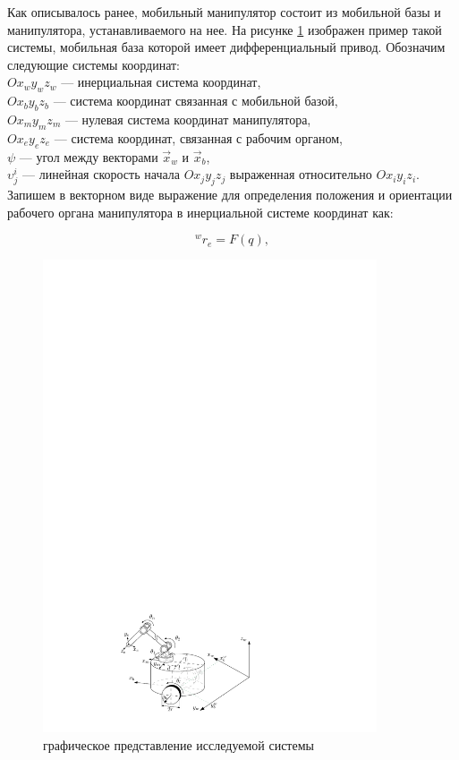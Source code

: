 \documentclass[14pt, a4paper]{extreport}
\begin{document}
Как описывалось ранее, мобильный манипулятор состоит из мобильной базы и манипулятора, устанавливаемого на нее. На рисунке \ref{pic:5} изображен пример такой системы, мобильная база которой имеет дифференциальный привод. Обозначим следующие системы координат:\\[2mm]
$O x_w y_w z_w$ --- инерциальная система координат,\\[2mm]
$O x_b y_b z_b$ --- система координат связанная с мобильной базой,\\[2mm]
$O x_m y_m z_m$ --- нулевая система координат манипулятора,\\[2mm]
$O x_e y_e z_e$ --- система координат, связанная с рабочим органом,\\[2mm]
$\psi$ --- угол между векторами $\vec{x}_w$ и $\vec{x}_b$,\\[2mm]
$\upsilon_{j}^{i}$ --- линейная скорость начала $O x_j y_j z_j$ выраженная относительно $O x_i y_i z_i$.\\[2mm]
\indent
Запишем в векторном виде выражение для определения положения и ориентации рабочего органа манипулятора в инерциальной системе координат как:

\begin{equation}
{^wr_e} = F(q),
\tag{4} \label{eq:4}
\end{equation}
\newpage
\begin{figure}[!h]
\centering
\captionsetup{justification=centering}
\renewcommand{\figurename}{Рисунок}
\includegraphics[width=0.88\textwidth]{MM3.pdf}	%
\caption{графическое представление исследуемой системы}
\label{pic:5}
\end{figure}
\end{document}
